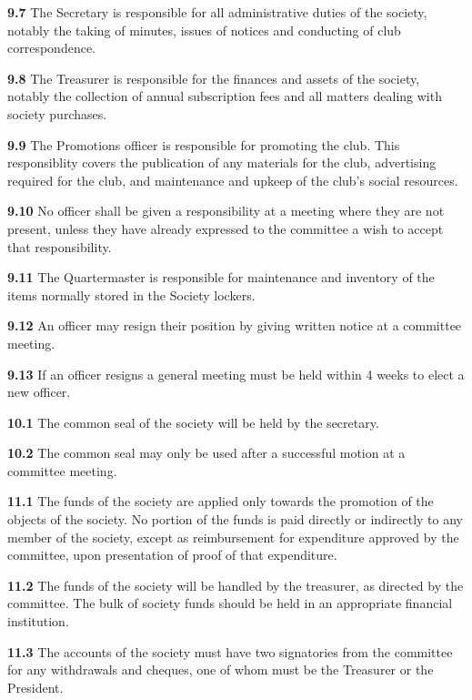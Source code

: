 \textbf{9.7} The Secretary is responsible for all administrative duties of the society, notably the taking of minutes, issues of notices and conducting of club correspondence.

\textbf{9.8} The Treasurer is responsible for the finances and assets of the society, notably the collection of annual subscription fees and all matters dealing with society purchases.

\textbf{9.9} The Promotions officer is responsible for promoting the club. This responsiblity covers the publication of any materials for the club, advertising required for the club, and maintenance and upkeep of the club's social resources.


\textbf{9.10} No officer shall be given a responsibility at a meeting where they are not present, unless they have already expressed to the committee a wish to accept that responsibility.

\textbf{9.11} The Quartermaster is responsible for maintenance and inventory of the items normally stored in the Society lockers.

\textbf{9.12} An officer may resign their position by giving written notice at a committee meeting. 

\textbf{9.13} If an officer resigns a general meeting must be held within 4 weeks to elect a new officer.

\vspace{1em}

\textbf{10.1} The common seal of the society will be held by the secretary.

\textbf{10.2} The common seal may only be used after a successful motion at a committee meeting.

\vspace{1em}

\textbf{11.1} The funds of the society are applied only towards the promotion of the objects of the society. No portion of the funds is paid directly or indirectly to any member of the society, except as reimbursement for expenditure approved by the committee, upon presentation of proof of that expenditure.

\textbf{11.2} The funds of the society will be handled by the treasurer, as directed by the committee. The bulk of society funds should be held in an appropriate financial institution. 

\textbf{11.3} The accounts of the society must have two signatories from the committee for any withdrawals and cheques, one of whom must be the Treasurer or the President.

